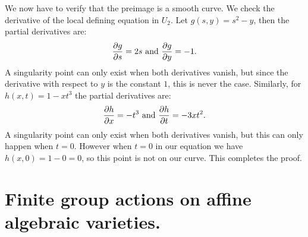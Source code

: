 \documentclass[11pt, a4paper]{article}
\begin{document}
\begin{solution}
  We now have to verify that the preimage is a smooth curve.
  We check the derivative of the local defining equation in $U_2$.
  Let $g(s,y) = s^2 - y$, then the partial derivatives are:
  \[
    \frac{\partial g}{\partial s} = 2s \text{ and }
    \frac{\partial g}{\partial y} = -1.
  \]
  A singularity point can only exist when both derivatives vanish,
  but since the derivative with respect to $y$ is the constant $1$,
  this is never the case.
  Similarly, for $h(x,t) = 1 - xt^3$ the partial derivatives are:
  \[
    \frac{\partial h}{\partial x} = -t^3 \text{ and }
    \frac{\partial h}{\partial t} = -3xt^2.
  \]
  A singularity point can only exist when both derivatives vanish,
  but this can only happen when $t = 0$.
  However when $t = 0$ in our equation we have $h(x,0) = 1 - 0 = 0$,
  so this point is not on our curve.
  This completes the proof.
\end{solution}

\newpage

\section{Finite group actions on affine algebraic varieties.}
\end{document}
